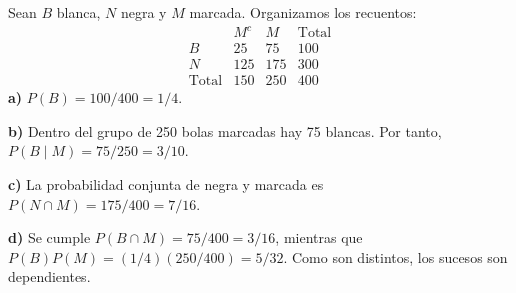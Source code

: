 Sean $B$ blanca, $N$ negra y $M$ marcada. Organizamos los recuentos:
\[
 \begin{array}{c|rr|r}
 &M^c&M&\text{Total}\\\hline
 B&25&75&100\\
 N&125&175&300\\\hline
 \text{Total}&150&250&400
 \end{array}
\]
\textbf{a)} $P(B)=100/400=\boxed{1/4}$.

\textbf{b)} Dentro del grupo de 250 bolas marcadas hay 75 blancas. Por tanto, $P(B\mid M)=75/250=\boxed{3/10}$.

\textbf{c)} La probabilidad conjunta de negra y marcada es $P(N\cap M)=175/400=\boxed{7/16}$.

\textbf{d)} Se cumple $P(B\cap M)=75/400=3/16$, mientras que $P(B)P(M)=(1/4)(250/400)=5/32$. Como son distintos, los sucesos son dependientes.
